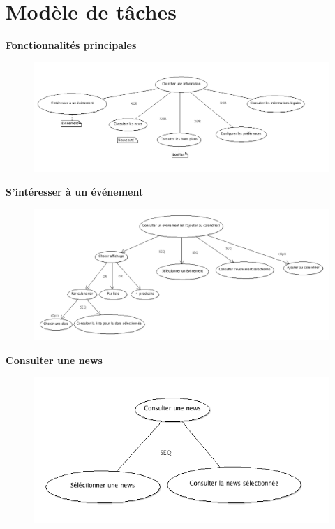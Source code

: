 \documentclass[a4paper, 11pt]{article}
\begin{document}
\section{Modèle de tâches}
\label{taches}

\textbf{Fonctionnalités principales}
\begin{figure}[h!]
\includegraphics[width=18cm]{taches_generales.png}
\end{figure}

\textbf{S'intéresser à un événement}
\begin{figure}[h!]
\includegraphics[width=18cm]{consulter_evenements.png}
\end{figure}
\vfill
\clearpage

\textbf{Consulter une news}
\begin{figure}[h!]
\includegraphics[width=16cm]{consulter_news.png}
\end{figure}
\end{document}
